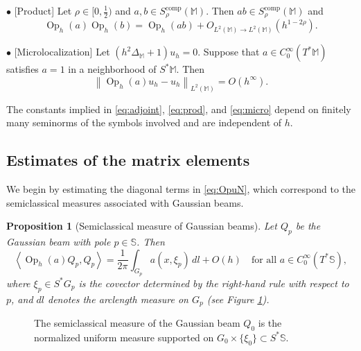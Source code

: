 \documentclass[12pt,reqno]{amsart}
\DeclareMathOperator{\Op}{Op}
\newcommand{\comp}{\mathrm{comp}}
\newcommand{\M}{\mathbb{M}}
\newcommand{\Sb}{\mathbb{S}}
\theoremstyle{plain}
\newtheorem{prop}[thm]{Proposition}
\theoremstyle{definition}
\theoremstyle{remark}
\numberwithin{equation}{section}
\begin{document}
$\bullet$ [Product] Let $\rho\in[0,\frac12)$ and $a,b\in S_\rho^\comp(\M)$. Then $ab\in S_\rho^\comp(\M)$ and
\begin{equation}\label{eq:prod}
\Op_h(a)\Op_h(b)=\Op_h(ab)+O_{L^2(\M)\to L^2(\M)}\left(h^{1-2\rho}\right).
\end{equation}

$\bullet$ [Microlocalization] Let $(h^2\Delta_\M+1)u_h=0$. Suppose that $a\in C^\infty_0(T^*\M)$ satisfies $a=1$ in a neighborhood of $S^*\M$. Then 
\begin{equation}\label{eq:micro}
\left\|\Op_h(a)u_h-u_h\right\|_{L^2(\M)}=O(h^\infty).
\end{equation}

The constants implied in \eqref{eq:adjoint}, \eqref{eq:prod}, and \eqref{eq:micro} depend on finitely many seminorms of the symbols involved and are independent of $h$.


\subsection{Estimates of the matrix elements}\label{sec:matrix}
We begin by estimating the diagonal terms in \eqref{eq:OpuN}, which correspond to the semiclassical measures associated with Gaussian beams.

\begin{prop}[Semiclassical measure of Gaussian beams]\label{prop:smG}
Let $Q_p$ be the Gaussian beam with pole $p\in\Sb$. Then
$$\left\langle\Op_h(a)Q_p,Q_p\right\rangle=\frac{1}{2\pi}\int_{G_p}a\left(x,\xi_p\right)\,dl+O(h)\quad\text{for all }a\in C_0^\infty(T^*\Sb),$$
where $\xi_p\in S^*G_p$ is the covector determined by the right-hand rule with respect to $p$, and $dl$ denotes the arclength measure on $G_p$ (see Figure \ref{fig:Gn}).
\end{prop}

\begin{figure}[H]
\caption{The semiclassical measure of the Gaussian beam $Q_0$ is the normalized uniform measure supported on $G_0\times\{\xi_0\}\subset S^*\Sb$.}
\label{fig:Gn}
\end{figure}
\end{document}
